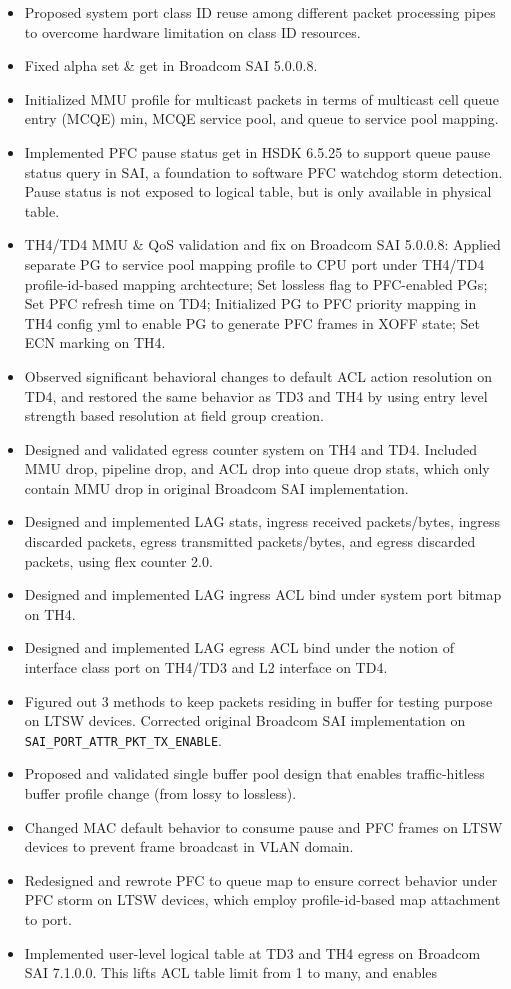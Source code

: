 \documentclass[letterpaper,11pt]{article}
\newcommand{\resitem}[1]{\item #1 \vspace{-2pt}}
\begin{document}
\begin{CJK}{UTF8}{gbsn}
\begin{itemize}
\begin{itemize}
  \resitem{Proposed system port class ID reuse among different packet processing pipes to overcome hardware limitation on class ID resources.}
  \resitem{Fixed alpha set \& get in Broadcom SAI 5.0.0.8.}
  \resitem{Initialized MMU profile for multicast packets in terms of multicast cell queue entry (MCQE) min, MCQE service pool,
  and queue to service pool mapping.}
  \resitem{Implemented PFC pause status get in HSDK 6.5.25 to support queue pause status query in SAI, a foundation to software PFC watchdog
  storm detection.
  Pause status is not exposed to logical table, but is only available in physical table.}
  \resitem{TH4/TD4 MMU \& QoS validation and fix on Broadcom SAI 5.0.0.8:
  Applied separate PG to service pool mapping profile to CPU port under TH4/TD4 profile-id-based mapping archtecture;
  Set lossless flag to PFC-enabled PGs;
  Set PFC refresh time on TD4;
  Initialized PG to PFC priority mapping in TH4 config yml to enable PG to generate PFC frames in XOFF state;
  Set ECN marking on TH4.
  }
  \resitem{Observed significant behavioral changes to default ACL action resolution on TD4,
  and restored the same behavior as TD3 and TH4 by using entry level strength based resolution at field group creation.}
  \resitem{Designed and validated egress counter system on TH4 and TD4. Included MMU drop, pipeline drop, and ACL drop into queue drop stats,
  which only contain MMU drop in original Broadcom SAI implementation.}
  \resitem{Designed and implemented LAG stats, ingress received packets/bytes, ingress discarded packets,
  egress transmitted packets/bytes, and egress discarded packets, using flex counter 2.0.}
  \resitem{Designed and implemented LAG ingress ACL bind under system port bitmap on TH4.}
  \resitem{Designed and implemented LAG egress ACL bind under the notion of interface class port on TH4/TD3 and L2 interface on TD4.}
  \resitem{Figured out 3 methods to keep packets residing in buffer for testing purpose on LTSW devices.
  Corrected original Broadcom SAI implementation on {\tt SAI\_PORT\_ATTR\_PKT\_TX\_ENABLE}.}
  \resitem{Proposed and validated single buffer pool design that enables traffic-hitless buffer profile change (from lossy to lossless).}
  \resitem{Changed MAC default behavior to consume pause and PFC frames on LTSW devices to prevent frame broadcast in VLAN domain.}
  \resitem{Redesigned and rewrote PFC to queue map to ensure correct behavior under PFC storm on LTSW devices,
  which employ profile-id-based map attachment to port.}
  \resitem{Implemented user-level logical table at TD3 and TH4 egress on Broadcom SAI 7.1.0.0. This lifts ACL table limit from 1 to many, and enables
}
\end{itemize}
\end{itemize}
\end{CJK}
\end{document}
